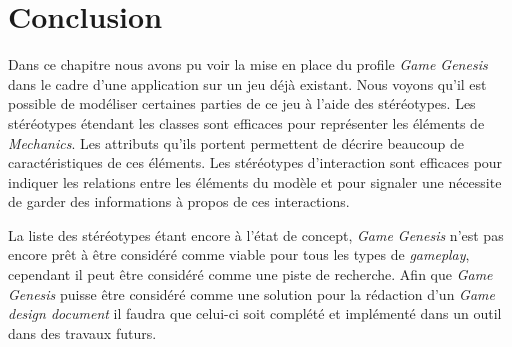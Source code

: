 \section{Conclusion}

Dans ce chapitre nous avons pu voir la mise en place du profile \emph{Game Genesis} dans le cadre d'une application sur un jeu déjà existant.
Nous voyons qu'il est possible de modéliser certaines parties de ce jeu à l'aide des stéréotypes.
Les stéréotypes étendant les classes sont efficaces pour représenter les éléments de \emph{Mechanics}.
Les attributs qu'ils portent permettent de décrire beaucoup de caractéristiques de ces éléments.
Les stéréotypes d'interaction sont efficaces pour indiquer les relations entre les éléments du modèle et pour signaler une nécessite de garder des informations à propos de ces interactions.

La liste des stéréotypes étant encore à l'état de concept, \emph{Game Genesis} n'est pas encore prêt à être considéré comme viable pour tous les types de \emph{gameplay}, cependant il peut être considéré comme une piste de recherche.
Afin que \emph{Game Genesis} puisse être considéré comme une solution pour la rédaction d'un \emph{Game design document} il faudra que celui-ci soit complété et implémenté dans un outil dans des travaux futurs.